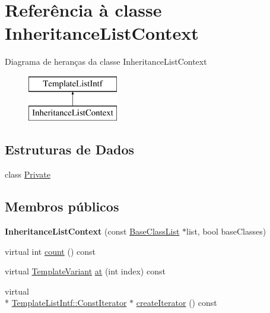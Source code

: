 \hypertarget{class_inheritance_list_context}{\section{Referência à classe Inheritance\-List\-Context}
\label{class_inheritance_list_context}
}
Diagrama de heranças da classe Inheritance\-List\-Context\begin{figure}[H]
\begin{center}
\leavevmode
\includegraphics[height=2.000000cm]{class_inheritance_list_context}
\end{center}
\end{figure}
\subsection*{Estruturas de Dados}
\begin{DoxyCompactItemize}
\item 
class \hyperlink{class_inheritance_list_context_1_1_private}{Private}
\end{DoxyCompactItemize}
\subsection*{Membros públicos}
\begin{DoxyCompactItemize}
\item 
\hypertarget{class_inheritance_list_context_ae31b0fc9e6ed68f71f087a46476dc0af}{{\bfseries Inheritance\-List\-Context} (const \hyperlink{class_base_class_list}{Base\-Class\-List} $\ast$list, bool base\-Classes)}\label{class_inheritance_list_context_ae31b0fc9e6ed68f71f087a46476dc0af}

\item 
virtual int \hyperlink{class_inheritance_list_context_a0745638c9967e2ed90bc96c012288c55}{count} () const 
\item 
virtual \hyperlink{class_template_variant}{Template\-Variant} \hyperlink{class_inheritance_list_context_a55f90d50fcb1378b2a97b9c3ad5bb162}{at} (int index) const 
\item 
virtual \\*
\hyperlink{class_template_list_intf_1_1_const_iterator}{Template\-List\-Intf\-::\-Const\-Iterator} $\ast$ \hyperlink{class_inheritance_list_context_a0b1d6dedc3f51750e5cba18f51022f10}{create\-Iterator} () const 
\end{DoxyCompactItemize}



